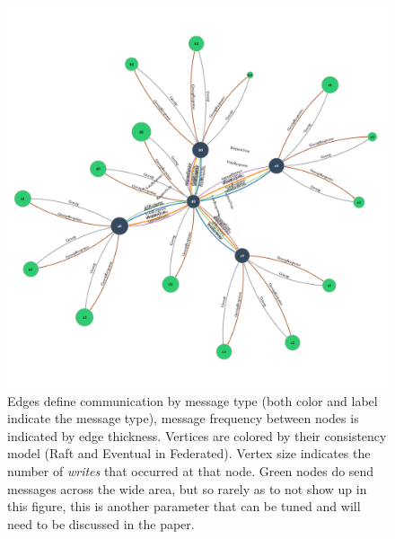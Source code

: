 \documentclass[11pt,letterpaper]{article}
\begin{document}
\begin{figure}[!h]
    \centering
        \includegraphics[width=\textwidth]{figures/federated-topology.png}
        \caption{\textsf{Edges define communication by message type (both color and label indicate the message type), message frequency between nodes is indicated by edge thickness. Vertices are colored by their consistency model (Raft and Eventual in Federated). Vertex size indicates the number of \textit{writes} that occurred at that node. Green nodes do send messages across the wide area, but so rarely as to not show up in this figure, this is another parameter that can be tuned and will need to be discussed in the paper.}}
        \label{fig:topology}
\end{figure}
\end{document}
